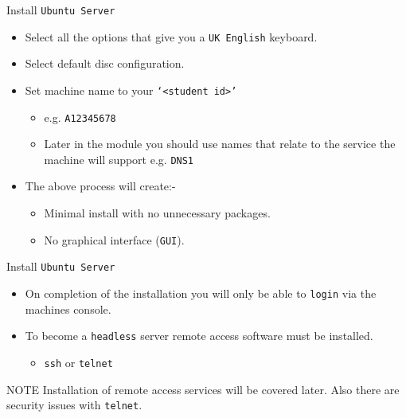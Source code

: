 \documentclass{beamer}
\begin{document}
\begin{frame}{Install \texttt{Ubuntu Server}}
  \begin{itemize}
    \item Select all the options that give you a \texttt{UK English} keyboard.
    \item Select default disc configuration.
    \item Set machine name to your \texttt{`<student id>'}
      \begin{itemize}
        \item e.g. \texttt{A12345678}
        \item Later in the module you should use names that relate to the service the machine will support e.g. \texttt{DNS1}
      \end{itemize}
    \item The above process will create:-
      \begin{itemize}
        \item Minimal install with no unnecessary packages.
        \item No graphical interface (\texttt{GUI}).
      \end{itemize}
  \end{itemize}
\end{frame}

\begin{frame}{Install \texttt{Ubuntu Server}}
  \begin{itemize}
    \item On completion of the installation you will only be able to \texttt{login} via the machines console.
    \item To become a \texttt{headless} server remote access software must be installed.
      \begin{itemize}
        \item \texttt{ssh} or \texttt{telnet}
      \end{itemize}
  \end{itemize}
  \begin{block}{NOTE}
    Installation of remote access services will be covered later. Also there are security issues with \texttt{telnet}. 
  \end{block}
\end{frame}
\end{document}
